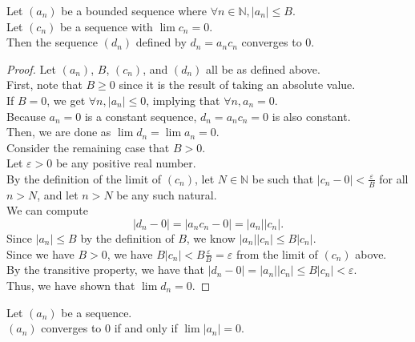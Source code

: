 \documentclass{article}
\newenvironment{theorem}[1]{\renewcommand\theinnercustomthm{#1}\innercustomthm}
  {\endinnercustomthm}
\begin{document}
\begin{theorem}{3}
    Let $(a_n)$ be a bounded sequence where $\forall n \in \mathbb N, |a_n| \le B$. \\
    Let $(c_n)$ be a sequence with $\lim c_n = 0$. \\
    Then the sequence $(d_n)$ defined by $d_n = a_n c_n$ converges to $0$.
\end{theorem}
\begin{proof}
    Let $(a_n)$, $B$, $(c_n)$, and $(d_n)$ all be as defined above. \\
    First, note that $B \ge 0$ since it is the result of taking an absolute value. \\
    If $B = 0$, we get $\forall n, |a_n| \le 0$, implying that $\forall n, a_n = 0$. \\
    Because $a_n = 0$ is a constant sequence, $d_n = a_n c_n = 0$ is also constant. \\
    Then, we are done as $\lim d_n = \lim a_n = 0$. \\
    Consider the remaining case that $B>0$. \\
    Let $\varepsilon > 0$ be any positive real number. \\
    By the definition of the limit of $(c_n)$, let $N \in \mathbb N$ be such that $|c_n - 0| < \frac{\varepsilon}{B}$ for all $n > N$, and let $n > N$ be any such natural. \\
    We can compute
    \[|d_n - 0| = |a_n c_n - 0| = |a_n||c_n|.\]
    Since $|a_n| \le B$ by the definition of $B$, we know $|a_n||c_n| \le B |c_n|$. \\
    Since we have $B>0$, we have $B |c_n| < B \frac{\varepsilon}{B} = \varepsilon$ from the limit of $(c_n)$ above. \\
    By the transitive property, we have that $|d_n - 0| = |a_n||c_n| \le B|c_n| < \varepsilon$. \\
    Thus, we have shown that $\lim d_n = 0$.
\end{proof}
\newpage{}
\begin{theorem}{4}
    Let $(a_n)$ be a sequence. \\
    $(a_n)$ converges to $0$ if and only if $\lim |a_n| = 0$.
\end{theorem}
\end{document}
